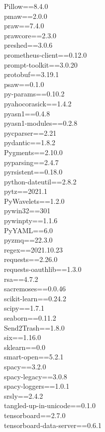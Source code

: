 \documentclass[11pt, a4paper]{article}
\begin{document}
Pillow==8.4.0\\
pmaw==2.0.0\\
praw==7.4.0\\
prawcore==2.3.0\\
preshed==3.0.6\\
prometheus-client==0.12.0\\
prompt-toolkit==3.0.20\\
protobuf==3.19.1\\
psaw==0.1.0\\
py-params==0.10.2\\
pyahocorasick==1.4.2\\
pyasn1==0.4.8\\
pyasn1-modules==0.2.8\\
pycparser==2.21\\
pydantic==1.8.2\\
Pygments==2.10.0\\
pyparsing==2.4.7\\
pyrsistent==0.18.0\\
python-dateutil==2.8.2\\
pytz==2021.1\\
PyWavelets==1.2.0\\
pywin32==301\\
pywinpty==1.1.6\\
PyYAML==6.0\\
pyzmq==22.3.0\\
regex==2021.10.23\\
requests==2.26.0\\
requests-oauthlib==1.3.0\\
rsa==4.7.2\\
sacremoses==0.0.46\\
scikit-learn==0.24.2\\
scipy==1.7.1\\
seaborn==0.11.2\\
Send2Trash==1.8.0\\
six==1.16.0\\
sklearn==0.0\\
smart-open==5.2.1\\
spacy==3.2.0\\
spacy-legacy==3.0.8\\
spacy-loggers==1.0.1\\
srsly==2.4.2\\
tangled-up-in-unicode==0.1.0\\
tensorboard==2.7.0\\
tensorboard-data-server==0.6.1\\
\end{document}
